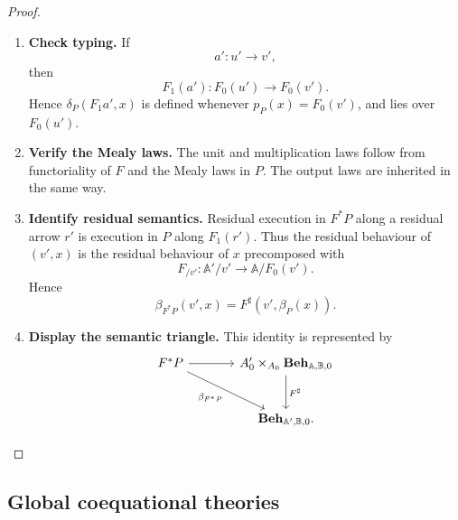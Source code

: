 \begin{proof}
    \leavevmode
    \begin{enumerate}
        \item \textbf{Check typing.}
        If
        \[
            a':u'\to v',
        \]
        then
        \[
            F_1(a'):F_0(u')\to F_0(v').
        \]
        Hence \(\delta_P(F_1a',x)\) is defined whenever
        \(p_P(x)=F_0(v')\), and lies over \(F_0(u')\).

        \item \textbf{Verify the Mealy laws.}
        The unit and multiplication laws follow from functoriality of \(F\) and
        the Mealy laws in \(P\). The output laws are inherited in the same way.

        \item \textbf{Identify residual semantics.}
        Residual execution in \(F^*P\) along a residual arrow \(r'\) is
        execution in \(P\) along \(F_1(r')\). Thus the residual behaviour of
        \((v',x)\) is the residual behaviour of \(x\) precomposed with
        \[
            F_{/v'}:\mathbb A'/v'\to\mathbb A/F_0(v').
        \]
        Hence
        \[
            \beta_{F^*P}(v',x)
            =
            F^\sharp(v',\beta_P(x)).
        \]

        \item \textbf{Display the semantic triangle.}
        This identity is represented by
        \[
        \begin{tikzcd}[column sep=large, row sep=large]
            F^*P
                \arrow[r]
                \arrow[dr, "\beta_{F^*P}"']
            &
            A'_0\times_{A_0}\mathbf{Beh}_{\mathbb A,\mathbb B,0}
                \arrow[d, "F^\sharp"]
            \\
            &
            \mathbf{Beh}_{\mathbb A',\mathbb B,0}.
        \end{tikzcd}
        \]
    \end{enumerate}
\end{proof}

\subsection{Global coequational theories}
\label{subsec:global-coequational-theories}

